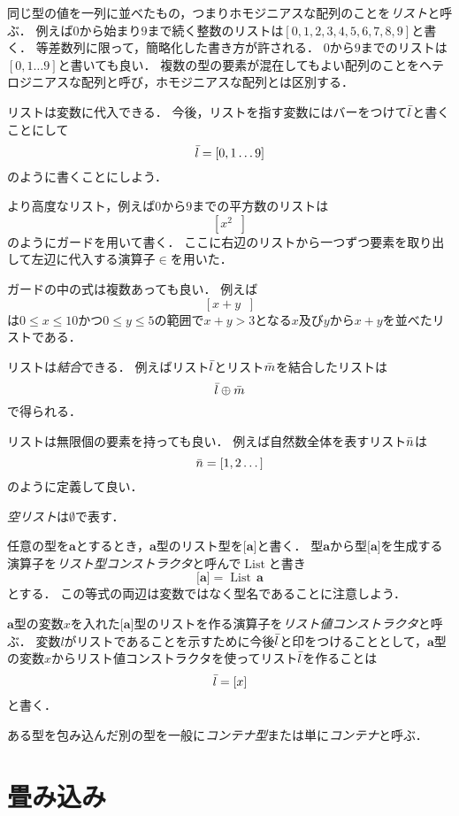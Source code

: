 \documentclass[twocolumn]{jsbook}
\newcommand{\hsklType}[1]{\textbf{#1}}
\newcommand{\hsklTypeConstructor}[1]{\mathop{\mathrm{#1}}}
\DeclareMathOperator{\hsklListConstructor}{\hsklTypeConstructor{List}}
\newcommand{\hsklAppend}{\oplus}
\newcommand{\hsklEmptyList}{\emptyset}
\newcommand{\hsklList}[1]{\Bar{#1}}
\newcommand{\hsklListType}[1]{\boldsymbol{[}#1\boldsymbol{]}}
\newcommand{\hsklTypeConstruct}[2]{#1\,#2}
\DeclareMathOperator{\mathFrom}{\in}
\newcommand{\mathGuard}[1]{\mathop{\mid_{#1}}}
\newcommand{\keyword}[1]{\emph{#1}}
\begin{document}
同じ型の値を一列に並べたもの，つまりホモジニアスな配列のことを\keyword{リスト}と呼ぶ．
例えば$0$から始まり$9$まで続く整数のリストは$[0,1,2,3,4,5,6,7,8,9]$と書く．
等差数列に限って，簡略化した書き方が許される．
$0$から$9$までのリストは$[0,1\dots9]$と書いても良い．
複数の型の要素が混在してもよい配列のことをヘテロジニアスな配列と呼び，ホモジニアスな配列とは区別する．

リストは変数に代入できる．
今後，リストを指す変数にはバーをつけて$\hsklList{l}$と書くことにして$$\hsklList{l}=[0,1\dots9]$$のように書くことにしよう．

より高度なリスト，例えば$0$から$9$までの平方数のリストは$$\left[x^2\mathGuard{x\mathFrom{[0,1\dots9]}}\right]$$のようにガードを用いて書く．
ここに右辺のリストから一つずつ要素を取り出して左辺に代入する演算子$\mathFrom$を用いた．

ガードの中の式は複数あっても良い．
例えば$$\left[x+y\mathGuard{x\mathFrom[0,1\dots9],\,y\mathFrom[0,1\dots5],\,x+y>3}\right]$$は$0\le x\le 10$かつ$0\le y\le 5$の範囲で$x+y>3$となる$x$及び$y$から$x+y$を並べたリストである．

リストは\keyword{結合}できる．
例えばリスト$\hsklList{l}$とリスト$\hsklList{m}$を結合したリストは$$\hsklList{l}\hsklAppend\hsklList{m}$$で得られる．

リストは無限個の要素を持っても良い．
例えば自然数全体を表すリスト$\hsklList{n}$は$$\hsklList{n}=[1,2\dots]$$のように定義して良い．

\keyword{空リスト}は$\hsklEmptyList$で表す．

任意の型を$\hsklType{a}$とするとき，$\hsklType{a}$型のリスト型を$\hsklListType{\hsklType{a}}$と書く．
型$\hsklType{a}$から型$\hsklListType{\hsklType{a}}$を生成する演算子を\keyword{リスト型コンストラクタ}と呼んで$\hsklListConstructor$と書き$$\hsklListType{\hsklType{a}}=\hsklTypeConstruct{\hsklListConstructor}{\hsklType{a}}$$とする．
この等式の両辺は変数ではなく型名であることに注意しよう．

$\hsklType{a}$型の変数$x$を入れた$\hsklListType{\hsklType{a}}$型のリストを作る演算子を\keyword{リスト値コンストラクタ}と呼ぶ．
変数$l$がリストであることを示すために今後$\hsklList{l}$と印をつけることとして，$\hsklType{a}$型の変数$x$からリスト値コンストラクタを使ってリスト$\hsklList{l}$を作ることは$$\hsklList{l}=[x]$$と書く．

ある型を包み込んだ別の型を一般に\keyword{コンテナ型}または単に\keyword{コンテナ}と呼ぶ．

\section{畳み込み}
\end{document}
